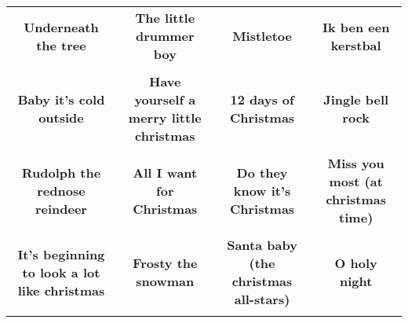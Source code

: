 \documentclass[12pt]{article} \usepackage{eso-pic, graphicx}
\newcommand{\background}[1]{%
\AddToShipoutPictureBG*{\texttt{[image: \#1]}}
}
\begin{document}
\tabcolsep=30.2pt \renewcommand{\arraystretch}{4.5}   \vspace*{4.3cm} \begin{center}  \begin{tabular}{c c c c}
\parbox{3cm}{\centering \textbf{Underneath the tree}}& 
\parbox{3cm}{\centering \textbf{The little drummer boy}}& 
\parbox{3cm}{\centering \textbf{Mistletoe}}& 
\parbox{3cm}{\centering \textbf{Ik ben een kerstbal}}\\ \\ 
\parbox{3cm}{\centering \textbf{Baby it’s cold outside}}& 
\parbox{3cm}{\centering \textbf{Have yourself a merry little christmas}}& 
\parbox{3cm}{\centering \textbf{12 days of Christmas}}& 
\parbox{3cm}{\centering \textbf{Jingle bell rock}}\\ \\ 
\parbox{3cm}{\centering \textbf{Rudolph the rednose reindeer}}& 
\parbox{3cm}{\centering \textbf{All I want for Christmas}}& 
\parbox{3cm}{\centering \textbf{Do they know it's Christmas}}& 
\parbox{3cm}{\centering \textbf{Miss you most (at christmas time)}}\\ \\ 
\parbox{3cm}{\centering \textbf{It’s beginning to look a lot like christmas}}& 
\parbox{3cm}{\centering \textbf{Frosty the snowman}}& 
\parbox{3cm}{\centering \textbf{Santa baby (the christmas all-stars)}}& 
\parbox{3cm}{\centering \textbf{O holy night}}\\ \\ 
\end{tabular} \background{discobingo.pdf} \end{center} 
\end{document}
